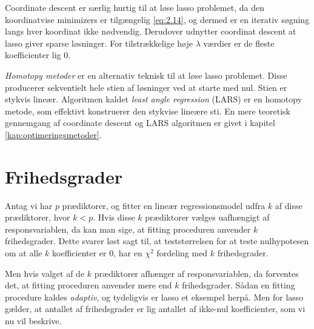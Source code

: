 
Coordinate descent er særlig hurtig til at løse lasso problemet, da den koordinatvise minimizers er tilgængelig \eqref{eq:2.14}, og dermed er en iterativ søgning langs hver koordinat ikke nødvendig.
Derudover udnytter coordinat descent at lasso giver sparse løsninger.
For tilstrækkelige høje \(\lambda\) værdier er de fleste koefficienter lig $0$.

\textit{Homotopy metoder} er en alternativ teknisk til at løse lasso problemet. 
Disse producerer sekventielt hele stien af løsninger ved at starte med nul.
Stien er stykvis lineær.
Algoritmen kaldet \textit{least angle regression} (LARS) er en homotopy metode, som effektivt konstruerer den stykvise lineære sti.
En mere teoretisk gennemgang af coordinate descent og LARS algoritmen er givet i kapitel \ref{kap:optimeringsmetoder}.
%
\section{Frihedsgrader}
Antag vi har \(p\) prædiktorer, og fitter en lineær regressionsmodel udfra \(k\) af disse prædiktorer, hvor \(k <p\).
Hvis disse \(k\) prædiktorer vælges uafhængigt af responsvariablen, da kan man sige, at fitting proceduren anvender \(k\) frihedsgrader.
Dette svarer løst sagt til, at teststørrelsen for at teste nulhypotesen om at alle \(k\) koefficienter er 0, har en \(\chi^2\) fordeling med \(k\) frihedsgrader.

Men hvis valget af de \(k\) prædiktorer afhænger af responsvariablen, da forventes det, at fitting proceduren anvender mere end \(k\) frihedsgrader. 
Sådan en fitting procedure kaldes \textit{adaptiv}, og tydeligvis er lasso et eksempel herpå.
Men for lasso gælder, at antallet af frihedsgrader er lig antallet af ikke-nul koefficienter, som vi nu vil beskrive.

